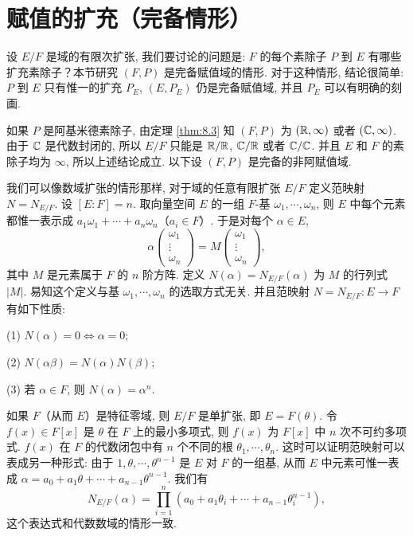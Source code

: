 \section{赋值的扩充（完备情形）}\label{sec:ch8-s3}

设 $E/F$ 是域的有限次扩张, 我们要讨论的问题是: $F$ 的每个素除子 $P$ 到 $E$ 有哪些扩充素除子？本节研究 $(F,P)$ 是完备赋值域的情形. 对于这种情形, 结论很简单: $P$ 到 $E$ 只有惟一的扩充 $P_E$, $(E,P_E)$ 仍是完备赋值域, 并且 $P_E$ 可以有明确的刻画.

如果 $P$ 是阿基米德素除子, 由定理 \ref{thm:8.3} 知 $(F,P)$ 为 $(\mathbb{R},\infty)$ 或者 $(\mathbb{C},\infty)$. 由于 $\mathbb{C}$ 是代数封闭的, 所以 $E/F$ 只能是 $\mathbb{R}/\mathbb{R}$, $\mathbb{C}/\mathbb{R}$ 或者 $\mathbb{C}/\mathbb{C}$. 并且 $E$ 和 $F$ 的素除子均为 $\infty$, 所以上述结论成立. 以下设 $(F,P)$ 是完备的非阿赋值域.

我们可以像数域扩张的情形那样, 对于域的任意有限扩张 $E/F$ 定义范映射 $N=N_{E/F}$. 设 $[E:F]=n$. 取向量空间 $E$ 的一组 $F$-基 $\omega_1,\cdots,\omega_n$, 则 $E$ 中每个元素都惟一表示成 $a_1\omega_1+\cdots+a_n\omega_n$（$a_i\in F$）. 于是对每个 $\alpha\in E$,
\[
  \alpha\left(\begin{array}{c}\omega_1\\ \vdots\\ \omega_n\end{array}\right)
  =M\left(\begin{array}{c}\omega_1\\ \vdots\\ \omega_n\end{array}\right),
\]
其中 $M$ 是元素属于 $F$ 的 $n$ 阶方阵. 定义 $N(\alpha)=N_{E/F}(\alpha)$ 为 $M$ 的行列式 $|M|$. 易知这个定义与基 $\omega_1,\cdots,\omega_n$ 的选取方式无关. 并且范映射 $N=N_{E/F}\colon E\to F$ 有如下性质:

(1) $N(\alpha)=0\Longleftrightarrow\alpha=0$;

(2) $N(\alpha\beta)=N(\alpha)N(\beta)$;

(3) 若 $\alpha\in F$, 则 $N(\alpha)=\alpha^n$.

如果 $F$（从而 $E$）是特征零域, 则 $E/F$ 是单扩张, 即 $E=F(\theta)$. 令 $f(x)\in F[x]$ 是 $\theta$ 在 $F$ 上的最小多项式, 则 $f(x)$ 为 $F[x]$ 中 $n$ 次不可约多项式. $f(x)$ 在 $F$ 的代数闭包中有 $n$ 个不同的根 $\theta_1,\cdots,\theta_n$. 这时可以证明范映射可以表成另一种形式: 由于 $1,\theta,\cdots,\theta^{n-1}$ 是 $E$ 对 $F$ 的一组基, 从而 $E$ 中元素可惟一表成 $\alpha=a_0+a_1\theta+\cdots+a_{n-1}\theta^{n-1}$. 我们有
\[
  N_{E/F}(\alpha)=\prod_{i=1}^{n}\left(a_0+a_1\theta_i+\cdots+a_{n-1}\theta_i^{n-1}\right),
\]
这个表达式和代数数域的情形一致.

